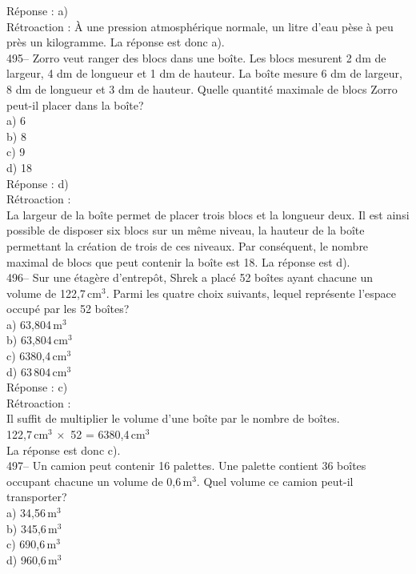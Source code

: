 ﻿\documentclass[letterpaper, 12pt]{article}
\begin{document}
R\'eponse : a)\\

R\'etroaction :
\`A une pression atmosph\'erique normale, un litre d'eau p\`ese \`a peu
pr\`es un kilogramme.  La r\'eponse est donc a).\\

495-- Zorro veut ranger des blocs dans une bo\^ite.  Les blocs mesurent 2 dm
de largeur, 4 dm de longueur et 1 dm de hauteur.  La bo\^ite mesure 6 dm de
largeur, 8 dm de longueur et 3 dm de hauteur.  Quelle quantit\'e maximale de
blocs Zorro peut-il placer dans la bo\^ite?\\
a) 6\\
b) 8\\
c) 9\\
d) 18\\

R\'eponse : d)\\

R\'etroaction : \\
La largeur de la bo\^ite permet de placer trois blocs et la longueur
deux. Il est ainsi possible de disposer six blocs sur un m\^eme
niveau, la hauteur de la bo\^ite permettant la cr\'eation de trois
de ces niveaux. Par cons\'equent, le nombre maximal de blocs que
peut contenir la bo\^ite est
18.  La r\'eponse est d).\\

496-- Sur une \'etag\`ere d'entrep\^ot, Shrek a plac\'e 52 bo\^ites ayant
chacune un volume de 122,7\,cm$^{3}$.  Parmi les quatre choix suivants,
lequel repr\'esente l'espace occup\'e par les 52 bo\^ites? \\
a) 63,804\,m$^{3}$\\
b) 63,804\,cm$^{3}$\\
c) 6380,4\,cm$^{3}$\\
d) $63\,804$\,cm$^{3}$\\

R\'eponse : c)\\

R\'etroaction : \\
Il suffit de multiplier le volume d'une bo\^ite par le nombre de bo\^ites.
\\
122,7\,cm$^{3}\,\times$ 52 = 6380,4\,cm$^{3}$\\
La r\'eponse est donc c).\\

497--  Un camion peut contenir 16 palettes.  Une palette contient 36
bo\^ites occupant chacune un volume de 0,6\,m$^{3}$.  Quel volume ce camion
peut-il transporter?\\
a) 34,56\,m$^{3}$\\
b) 345,6\,m$^{3}$\\
c) 690,6\,m$^{3}$\\
d) 960,6\,m$^{3}$\\
\end{document}
